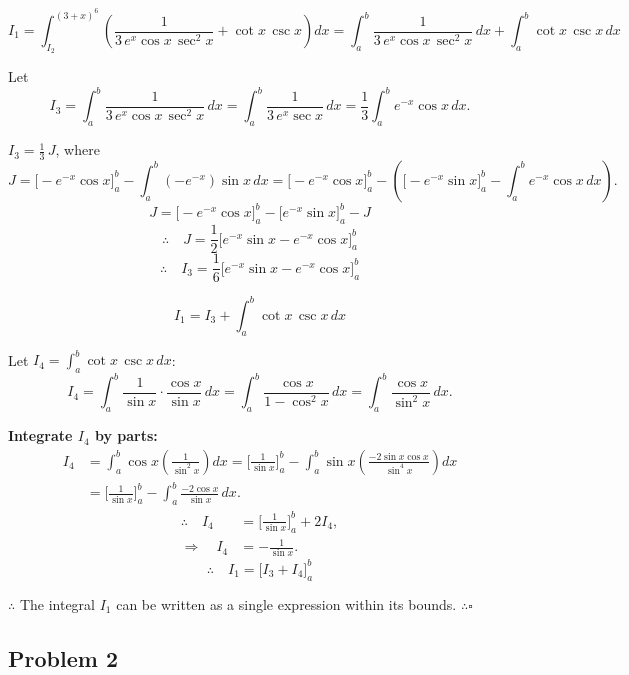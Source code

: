 \documentclass[openany,oneside,12pt,hidelinks]{book}
\begin{document}
\[
  I_1
  = \int_{I_{2}}^{(3+x)^{6}}
  \left(
  \frac{1}{3\,e^{x}\cos x\,\sec^{2}x}
  + \cot x\,\csc x
  \right) dx
  = \int_{a}^{b}\frac{1}{3\,e^{x}\cos x\,\sec^{2}x}\,dx
  + \int_{a}^{b}\cot x\,\csc x\,dx
\]

Let
\[
  I_{3}
  = \int_{a}^{b}\frac{1}{3\,e^{x}\cos x\,\sec^{2}x}\,dx
  = \int_{a}^{b}\frac{1}{3\,e^{x}\sec x}\,dx
  = \frac{1}{3}\int_{a}^{b} e^{-x}\cos x\,dx.
\]

\(I_{3} = \tfrac{1}{3}\,J\), where
\[
  J
  = \Big[-e^{-x}\cos x\Big]_{a}^{b}
  - \int_{a}^{b} (-e^{-x})\sin x\,dx
  = \Big[-e^{-x}\cos x\Big]_{a}^{b}
  - \left(
  \Big[-e^{-x}\sin x\Big]_{a}^{b}
  - \int_{a}^{b} e^{-x}\cos x\,dx
  \right).
\]
\[
  J
  = \Big[-e^{-x}\cos x\Big]_{a}^{b}
  - \Big[e^{-x}\sin x\Big]_{a}^{b}
  - J
\]
\[
  \therefore\quad
  J = \frac{1}{2}\Big[e^{-x}\sin x - e^{-x}\cos x\Big]_{a}^{b}
\]
\[
  \therefore\quad
  I_{3} = \frac{1}{6}\Big[e^{-x}\sin x - e^{-x}\cos x\Big]_{a}^{b}
\]

\[
  I_{1} = I_{3} + \int_{a}^{b}\cot x\,\csc x\,dx
\]

Let \(I_{4} = \displaystyle\int_{a}^{b}\cot x\,\csc x\,dx\):
\[
  I_{4}
  = \int_{a}^{b}\frac{1}{\sin x}\cdot\frac{\cos x}{\sin x}\,dx
  = \int_{a}^{b}\frac{\cos x}{1-\cos^{2}x}\,dx
  = \int_{a}^{b}\frac{\cos x}{\sin^{2}x}\,dx.
\]

\textbf{Integrate \(I_4\) by parts:}
\[
  \begin{aligned}
    I_{4}
     & = \int_{a}^{b}\cos x\left(\frac{1}{\sin^{2}x}\right)dx
    = \Big[\frac{1}{\sin x}\Big]_{a}^{b}
    - \int_{a}^{b}\sin x\left(\frac{-2\sin x\cos x}{\sin^{4}x}\right)dx \\
     & = \Big[\frac{1}{\sin x}\Big]_{a}^{b}
    - \int_{a}^{b}\frac{-2\cos x}{\sin x}\,dx.
  \end{aligned}
\]
\[
  \begin{aligned}
    \therefore\quad I_{4}  & = \Big[\frac{1}{\sin x}\Big]_{a}^{b} + 2I_{4}, \\
    \Rightarrow\quad I_{4} & = -\frac{1}{\sin x}.
  \end{aligned}
\]
\[
  \therefore\quad I_{1} = \Big[I_{3} + I_{4}\Big]_{a}^{b}
\]

{\(\therefore\) The integral \(I_{1}\) can be written as a single expression within
its bounds.} \(\therefore \square\)


\subsection{Problem 2}
\end{document}
